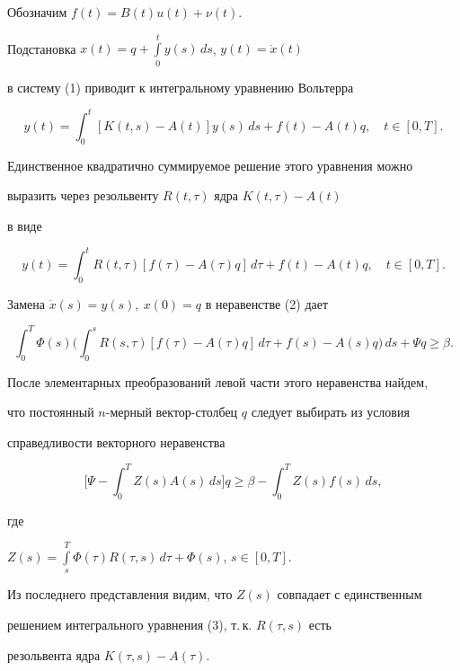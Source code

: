 \begin{pf}


Обозначим $f(t) = B(t)u(t) + \nu(t)$.


Подстановка $x(t) = q + \int\limits_0^t y(s)\,ds$, $y(t) = \Dot x(t)$


в систему (1) приводит к интегральному уравнению Вольтерра


$$


y(t) = \int_0^t[K(t,s) - A(t)]y(s)\,ds + f(t) - A(t)q, \quad t\in[0,T].


$$


Единственное квадратично суммируемое решение этого уравнения можно


выразить через резольвенту $R(t,\tau)$ ядра $K(t,\tau) - A(t)$


в виде


$$


y(t) = \int_0^t R(t,\tau)[f(\tau) - A(\tau)q]\,d\tau +f(t) - A(t)q,


\quad t\in[0,T].


$$


Замена $\Dot x(s) = y(s),\ x(0) = q$ в неравенстве (2) дает


$$


\int_0^T \Phi(s)\bigg(\int_0^s R(s,\tau)[f(\tau) - A(\tau)q]\,d\tau +


f(s) - A(s)q \bigg)\,ds + \Psi q \ge\beta.


$$


После элементарных преобразований левой части этого неравенства найдем,


что постоянный $n$-мерный вектор-столбец $q$ следует выбирать из условия


справедливости векторного неравенства


\begin{equation}


\bigg[\Psi - \int_0^T Z(s)A(s)\,ds\bigg]q \ge\beta - \int_0^T Z(s)f(s)\,ds, 


\end{equation}


где


$Z(s) = \int\limits_s^T \Phi(\tau)R(\tau,s)\,d\tau + \Phi(s)$, $s\in[0,T]$.


Из последнего представления видим, что $Z(s)$ совпадает с единственным


решением интегрального уравнения (3), т.\,к. $R(\tau,s)$ есть


резольвента ядра $K(\tau,s) - A(\tau)$.






\end{pf}
